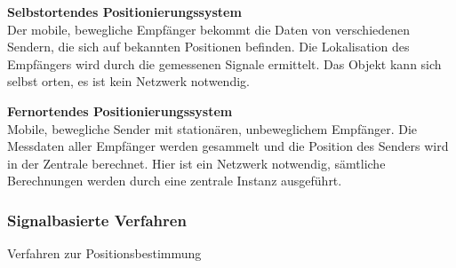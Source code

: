 \begin{itemize}

    \textbf{Selbstortendes Positionierungssystem}\\
    Der mobile, bewegliche Empfänger bekommt die Daten von verschiedenen Sendern, die sich auf bekannten Positionen befinden. Die Lokalisation des Empfängers wird durch die gemessenen Signale ermittelt. Das Objekt kann sich selbst orten, es ist kein Netzwerk notwendig.

    \textbf{Fernortendes Positionierungssystem}\\
    Mobile, bewegliche Sender mit stationären, unbeweglichem Empfänger. Die Messdaten aller Empfänger werden gesammelt und die Position des Senders wird in der Zentrale berechnet. Hier ist ein Netzwerk notwendig, sämtliche Berechnungen werden durch eine zentrale Instanz ausgeführt.

    \subsubsection{Signalbasierte Verfahren}

    Verfahren zur Positionsbestimmung   


\end{itemize}

